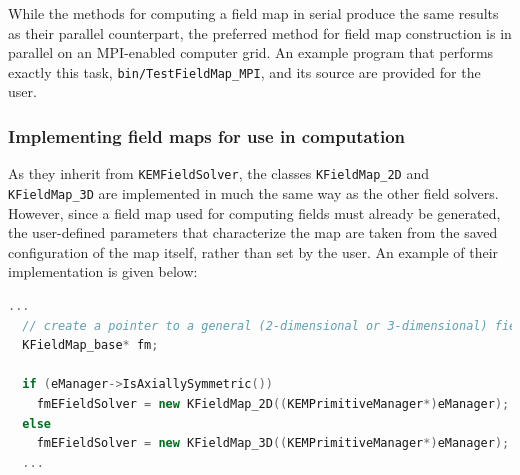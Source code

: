 \documentclass[11pt,a4paper,oneside]{article}
\begin{document}
While the methods for computing a field map in serial produce the same results as their parallel counterpart, the preferred method for field map construction is in parallel on an MPI-enabled computer grid.  An example program that performs exactly this task, \texttt{bin/TestFieldMap\_MPI}, and its source are provided for the user.  

\subsubsection{Implementing field maps for use in computation}
\label{subsubsec:constructingFieldMaps}

As they inherit from \texttt{KEMFieldSolver}, the classes \texttt{KFieldMap\_2D} and \texttt{KFieldMap\_3D} are implemented in much the same way as the other field solvers.  However, since a field map used for computing fields must already be generated, the user-defined parameters that characterize the map are taken from the saved configuration of the map itself, rather than set by the user.  An example of their implementation is given below:
%
\begin{lstlisting}[language=C++]
  ...  
  // create a pointer to a general (2-dimensional or 3-dimensional) field map
  KFieldMap_base* fm;

  if (eManager->IsAxiallySymmetric())
    fmEFieldSolver = new KFieldMap_2D((KEMPrimitiveManager*)eManager);
  else
    fmEFieldSolver = new KFieldMap_3D((KEMPrimitiveManager*)eManager);
  ...
\end{lstlisting}
\end{document}
